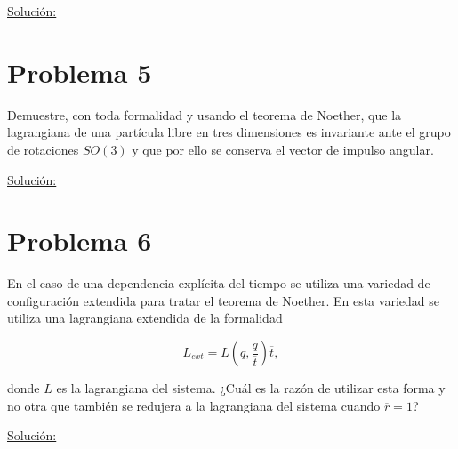 \documentclass[a4paper,10pt]{article}
\numberwithin{equation}{section}
\begin{document}
\underline{Solución:} \vspace{.3cm}

\section{Problema 5}

Demuestre, con toda formalidad y usando el teorema de Noether, que la lagrangiana 
de una partícula libre en tres dimensiones es invariante ante el grupo de rotaciones 
$SO(3)$ y que por ello se conserva el vector de impulso angular.

\vspace{.3cm}

\underline{Solución:} \vspace{.3cm}

\section{Problema 6}

En el caso de una dependencia explícita del tiempo se utiliza una variedad de configuración 
extendida para tratar el teorema de Noether. En esta variedad se utiliza una lagrangiana 
extendida de la formalidad

$$
L_{ext} = L(q,\frac{\overline{q}}{\overline{t}})\overline{t},
$$

donde $L$ es la lagrangiana del sistema. ¿Cuál es la razón de utilizar esta forma y no 
otra que también se redujera a la lagrangiana del sistema cuando $\overline{r}=1$?

\vspace{.3cm}

\underline{Solución:} \vspace{.3cm}
\end{document}
